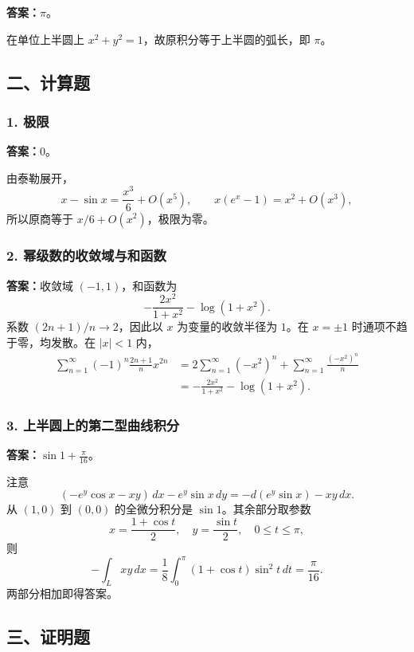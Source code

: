 \documentclass[11pt,fontset=fandol]{ctexart}
\begin{document}
\textbf{答案：}\(\pi\)。

在单位上半圆上 \(x^2+y^2=1\)，故原积分等于上半圆的弧长，即 \(\pi\)。

\subsection{二、计算题}\label{ux4e8cux8ba1ux7b97ux9898}

\subsubsection{1. 极限}\label{ux6781ux9650}

\textbf{答案：}\(0\)。

由泰勒展开， \[
x-\sin x=\frac{x^3}{6}+O(x^5),\qquad
x(e^x-1)=x^2+O(x^3),
\] 所以原商等于 \(x/6+O(x^2)\)，极限为零。

\subsubsection{2.
幂级数的收敛域与和函数}\label{ux5e42ux7ea7ux6570ux7684ux6536ux655bux57dfux4e0eux548cux51fdux6570}

\textbf{答案：}收敛域 \((-1,1)\)，和函数为 \[
\boxed{-\frac{2x^2}{1+x^2}-\log(1+x^2)}.
\] 系数 \((2n+1)/n\to2\)，因此以 \(x\) 为变量的收敛半径为 \(1\)。在
\(x=\pm1\) 时通项不趋于零，均发散。在 \(|x|<1\) 内， \[
\begin{aligned}
\sum_{n=1}^\infty(-1)^n\frac{2n+1}{n}x^{2n}
&=2\sum_{n=1}^\infty(-x^2)^n+\sum_{n=1}^\infty\frac{(-x^2)^n}{n}\\
&=-\frac{2x^2}{1+x^2}-\log(1+x^2).
\end{aligned}
\]

\subsubsection{3.
上半圆上的第二型曲线积分}\label{ux4e0aux534aux5706ux4e0aux7684ux7b2cux4e8cux578bux66f2ux7ebfux79efux5206}

\textbf{答案：}\(\displaystyle\sin1+\frac\pi{16}\)。

注意 \[
(-e^y\cos x-xy)\,dx-e^y\sin x\,dy
=-d(e^y\sin x)-xy\,dx.
\] 从 \((1,0)\) 到 \((0,0)\) 的全微分积分是 \(\sin1\)。其余部分取参数 \[
x=\frac{1+\cos t}{2},\quad y=\frac{\sin t}{2},\quad0\le t\le\pi,
\] 则 \[
-\int_Lxy\,dx
=\frac18\int_0^\pi(1+\cos t)\sin^2t\,dt=\frac\pi{16}.
\] 两部分相加即得答案。

\subsection{三、证明题}\label{ux4e09ux8bc1ux660eux9898}
\end{document}
